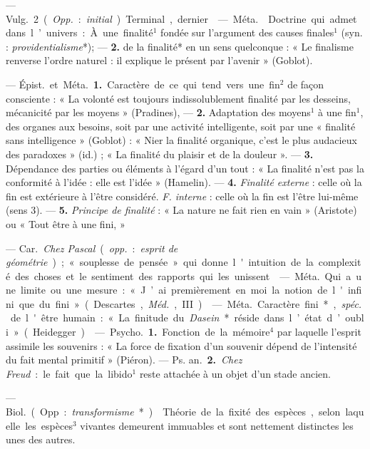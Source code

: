 \begin{itemize}[leftmargin=1cm, label=, itemsep=1pt]
— \si{Vulg.} 2 ({\it Opp.} : {\it initial}). Terminal, dernier.

 — \si{Méta.}  Doctrine qui
admet dans l’univers : À. une finalité$^1$ fondée sur l'argument des
causes finales$^1$ (syn. : {\it providentialisme}*); — {\bf 2.} de la
finalité* en un sens quelconque : « Le finalisme renverse l’ordre naturel :
il explique le présent par l'avenir » (Goblot).

 — \si{Épist.} et \si{Méta.} {\bf 1.} Caractère de ce qui tend
vers une fin$^2$ de façon consciente : « La volonté est toujours
indissolublement finalité par les desseins, mécanicité par les moyens
 » (Pradines), — {\bf 2.} Adaptation des moyens$^1$ à une fin$^1$, des
organes aux besoins, soit par une activité intelligente, soit par une
« finalité sans intelligence » (Goblot) : « Nier la finalité organique, c'est
le plus audacieux des paradoxes » (id.) ; « La finalité du plaisir et de la
douleur ».
— {\bf 3.} Dépendance des parties ou éléments à l'égard d’un tout :
« La finalité n’est pas la conformité à l’idée : elle est l'idée » (Hamelin).
— {\bf 4.} {\it Finalité externe} : celle où la fin est extérieure à l'être
considéré. {\it F. interne} : celle où la fin est l'être lui-même (sens 3).
— {\bf 5.} {\it Principe de finalité} : « La nature ne fait rien en
vain » (Aristote) ou « Tout être à une fini, »

 — \si{Car.} {\it Chez Pascal} ({\it opp.} :
{\it esprit de géométrie}) ; « souplesse de pensée » qui donne l'intuition de
la complexité des choses et le sentiment des rapports qui les unissent.

 — \si{Méta.} Qui a une limite ou une mesure : « J’ai premièrement en
moi la notion de l'infini que du fini» (Descartes, {\it Méd.}, III).

 — \si{Méta.} Caractère fini*, {\it spéc.} de l'être humain :
« La finitude du {\it Dasein}* réside dans l’état d’oubli » (Heidegger).

 — \si{Psycho.} {\bf 1.} Fonction de la
mémoire$^4$ par laquelle l’esprit assimile les souvenirs : « La force de
fixation d’un souvenir dépend de l'intensité du fait mental primitif »
(Piéron). — \si{Ps. an.} {\bf 2.} {\it Chez Freud} :
le fait que la libido$^1$ reste attachée à un objet d’un stade ancien.

 — \si{Biol.} (Opp. : {\it transformisme}*). 
Théorie de la fixité des espèces, selon laquelle les espèces$^3$ vivantes
demeurent immuables et sont nettement distinctes les unes des autres.


\end{itemize}
